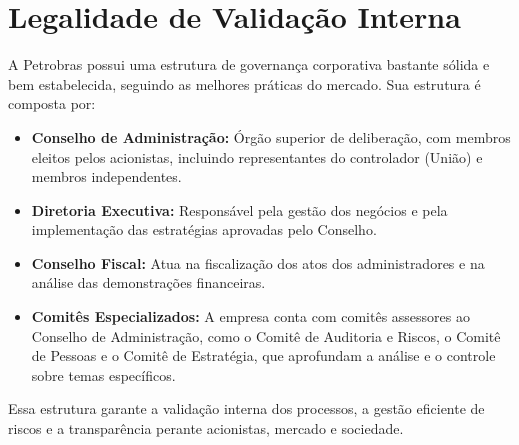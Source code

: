 \documentclass[12pt, a4paper]{article}
\begin{document}
\section{Legalidade de Validação Interna}

A Petrobras possui uma estrutura de governança corporativa bastante sólida e bem estabelecida, seguindo as melhores práticas do mercado. Sua estrutura é composta por:

\begin{itemize}
    \item \textbf{Conselho de Administração:} Órgão superior de deliberação, com membros eleitos pelos acionistas, incluindo representantes do controlador (União) e membros independentes.
    
    \item \textbf{Diretoria Executiva:} Responsável pela gestão dos negócios e pela implementação das estratégias aprovadas pelo Conselho.
    
    \item \textbf{Conselho Fiscal:} Atua na fiscalização dos atos dos administradores e na análise das demonstrações financeiras.
    
    \item \textbf{Comitês Especializados:} A empresa conta com comitês assessores ao Conselho de Administração, como o Comitê de Auditoria e Riscos, o Comitê de Pessoas e o Comitê de Estratégia, que aprofundam a análise e o controle sobre temas específicos.
\end{itemize}

Essa estrutura garante a validação interna dos processos, a gestão eficiente de riscos e a transparência perante acionistas, mercado e sociedade.
\end{document}
